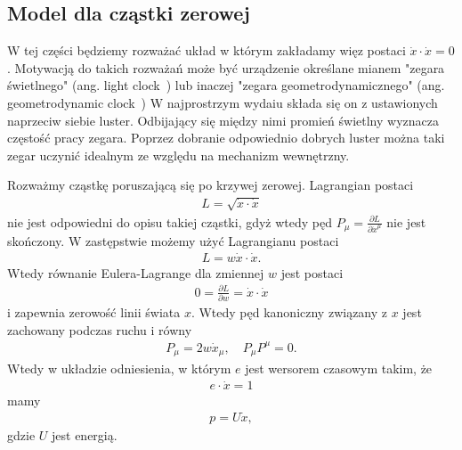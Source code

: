\subsection{Model dla cząstki zerowej}
W tej części będziemy rozważać układ w którym zakładamy
więz postaci $\dot{x} \cdot \dot{x} = 0$.
Motywacją do takich rozważań może być urządzenie 
określane mianem "zegara świetlnego" (ang. light 
clock~\cite{Fletcher2013, West2007}) lub inaczej
"zegara geometrodynamicznego" (ang. geometrodynamic 
clock~\cite{ohanian2013gravitation})
W najprostrzym wydaiu składa się on z ustawionych 
naprzeciw siebie luster.
Odbijający się między nimi promień świetlny 
wyznacza częstość pracy zegara.
Poprzez dobranie odpowiednio dobrych luster można taki zegar
uczynić idealnym ze względu na mechanizm wewnętrzny.

Rozważmy cząstkę poruszającą się po krzywej zerowej.
Lagrangian postaci
\begin{align}
L = \sqrt{\dot{x} \cdot \dot{x} }
\end{align}
nie jest odpowiedni do opisu takiej cząstki, gdyż 
wtedy pęd $P_\mu = \frac{\partial L}{\partial \dot{x}^\mu}$ 
nie jest skończony. 
W zastępstwie możemy użyć 
Lagrangianu postaci~\cite{}
\begin{align}
L = w\dot{x} \cdot \dot{x}.
\end{align}
Wtedy równanie Eulera-Lagrange dla zmiennej $w$ jest postaci
\begin{align}
0 = \frac{\partial L}{\partial w} =  \dot{x} \cdot \dot{x}
\end{align}
i zapewnia zerowość linii świata $x$. Wtedy pęd
kanoniczny związany z $x$  jest zachowany podczas ruchu i równy
\begin{align}
P_\mu = 2 w \dot{x}_\mu, \quad P_\mu P^\mu = 0.
\end{align}
Wtedy w układzie odniesienia, w 
którym $e$ jest wersorem czasowym
takim, że 
\begin{align}
e\cdot \dot{x}=1
\end{align} 
mamy
\begin{align}
    p = U \dot{x},
\end{align}
gdzie $U$ jest energią.



